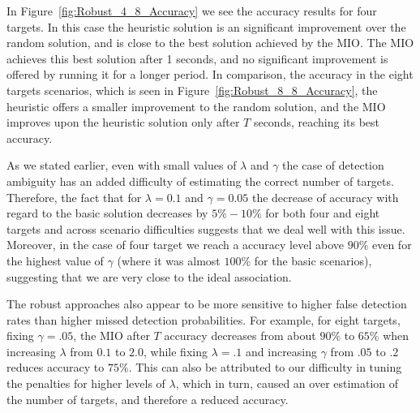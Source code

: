 In Figure~\ref{fig:Robust_4_8_Accuracy} we see the accuracy results for four targets. In this case the heuristic solution is an significant improvement over the random solution, and is close to the best solution achieved by the MIO. The MIO achieves this best solution after 1 seconds, and no significant improvement is offered by running it for a longer period. In comparison, the accuracy in the eight targets scenarios, which is seen in Figure~\ref{fig:Robust_8_8_Accuracy}, the heuristic offers a smaller improvement to the random solution, and the MIO improves upon the heuristic solution only  after $T$ seconds, reaching its best accuracy. 

As we stated earlier, even with small values of $\lambda$ and $\gamma$ the case of detection ambiguity has an added difficulty of estimating the correct number of targets. Therefore, the fact that for $\lambda=0.1$ and $\gamma=0.05$ the decrease of accuracy with regard to the basic solution decreases by $5\%-10\%$ for both four and eight targets and across scenario difficulties suggests that we deal  well with this issue. Moreover, in the case of four target we reach a accuracy level above $90\%$  even for the highest value of $\gamma$ (where it was almost $100\%$ for the basic scenarios), suggesting that we are very close to the ideal association.

The robust approaches also appear to be more sensitive to higher false detection rates than higher missed detection probabilities. For example, for eight targets, fixing $\gamma=.05$, the MIO after $T$ accuracy decreases from about $90\%$ to $65\%$ when increasing $\lambda$ from $0.1$ to $2.0$, while fixing $\lambda=.1$ and increasing $\gamma$ from $.05$ to $.2$ reduces accuracy to $75\%$. This can also be attributed to our difficulty in tuning the penalties for higher levels of $\lambda$, which in turn, caused an over estimation of the number of targets, and therefore a reduced accuracy. 

